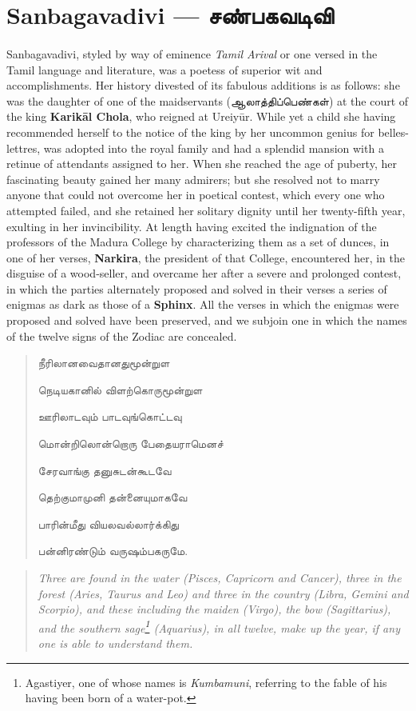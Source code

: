 \documentclass{article}
\newcommand{\TamilText}[1]{\texttamil{#1}}
\newcommand{\TamilBold}[1]{\texttamil{\textbf{#1}}}
\newcommand{\tam}[1]{\TamilText{#1}}
\newcommand{\tambold}[1]{\TamilBold{#1}}
\begin{document}
\section{Sanbagavadivi --- \tambold{சண்பகவடிவி}}
\paragraph{}
Sanbagavadivi, styled by way of eminence \emph{Tamil Arival} or one versed in the Tamil language and literature, was a poetess of superior wit and accomplishments. Her history divested of its fabulous additions is as follows: she was the daughter of one of the maidservants (\tam{ஆலாத்திப்பெண்கள்}) at the court of the king \textbf{Karik\={a}l Chola}, who reigned at Ureiy\={u}r. While yet a child she having recommended herself to the notice of the king by her uncommon genius for belles-lettres, was adopted into the royal family and had a splendid mansion with a retinue of attendants assigned to her. When she reached the age of puberty, her fascinating beauty gained her many admirers; but she resolved not to marry anyone that could not overcome her in poetical contest, which every one who attempted failed, and she retained her solitary dignity until her twenty-fifth year, exulting in her invincibility. At length having excited the indignation of the professors of the Madura College by characterizing them as a set of dunces, in one of her verses, \textbf{Narkira}, the president of that College, encountered her, in the disguise of a wood-seller, and overcame her after a severe and prolonged contest, in which the parties alternately proposed and solved in their verses a series of enigmas as dark as those of a \textbf{Sphinx}. All the verses in which the enigmas were proposed and solved have been preserved, and we subjoin one in which the names of the twelve signs of the Zodiac are concealed.
\begin{quotation}\small
\tam{நீரிலானவைதானதுமூன்றுள}

\tam{நெடியகானில்‌ விளற்கொருமூன்றுள}

\tam{ஊரிலாடவும்‌ பாடவுங்கொட்டவு}

\tam{மொன்றிலொன்றொரு பேதையராமெனச்‌}

\tam{சேரவாங்கு தனுசுடன்கூடவே}

\tam{தெற்குமாமுனி தன்னையுமாகவே}

\tam{பாரின்மீது வியலவல்லார்க்கிது}

\tam{பன்னிரண்டும்‌ வருஷம்பகருமே}.
\end{quotation}
\begin{quotation}\small
\emph{Three are found in the water (Pisces, Capricorn and Cancer), three in the forest (Aries, Taurus and Leo) and three in the country (Libra, Gemini and Scorpio), and these including the maiden (Virgo), the bow (Sagittarius), and the southern sage\footnote{Agastiyer, one of whose names is \emph{Kumbamuni}, referring to the fable of his having been born of a water-pot.} (Aquarius), in all twelve, make up the year, if any one is able to understand them.}
\end{quotation}
\end{document}
